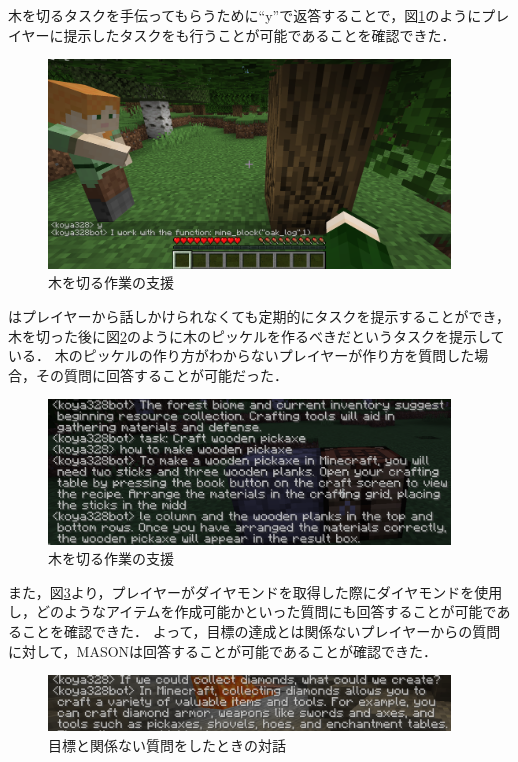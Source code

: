 木を切るタスクを手伝ってもらうために``y''で返答することで，図\ref{fig:task_help}のようにプレイヤーに提示したタスクを{\mason}も行うことが可能であることを確認できた．
\begin{figure}[H]
    \centering
    \includegraphics[width=0.95\textwidth]{fig/task_help.PNG}
    \caption{木を切る作業の支援}
    \label{fig:task_help}
\end{figure}

{\mason}はプレイヤーから話しかけられなくても定期的にタスクを提示することができ，木を切った後に図\ref{fig:wooden_pickaxe}のように木のピッケルを作るべきだというタスクを提示している．
木のピッケルの作り方がわからないプレイヤーが作り方を質問した場合，その質問に回答することが可能だった．
\begin{figure}[H]
    \centering
    \includegraphics[width=0.95\textwidth]{fig/wooden_pickaxe.png}
    \caption{木を切る作業の支援}
    \label{fig:wooden_pickaxe}
\end{figure}

また，図\ref{fig:diamond_question}より，プレイヤーがダイヤモンドを取得した際にダイヤモンドを使用し，どのようなアイテムを作成可能かといった質問にも回答することが可能であることを確認できた．
よって，目標の達成とは関係ないプレイヤーからの質問に対して，MASONは回答することが可能であることが確認できた．
\begin{figure}[H]
    \centering
    \includegraphics[width=0.95\textwidth]{fig/diamond_question.PNG}
    \caption{目標と関係ない質問をしたときの対話}
    \label{fig:diamond_question}
\end{figure}

